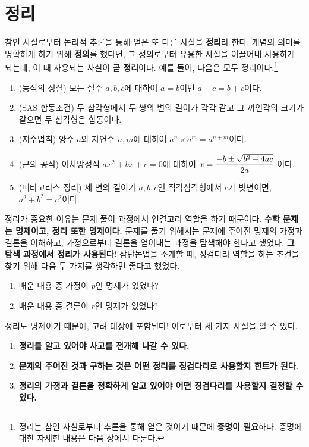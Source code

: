\pagebreak

\section{정리}

참인 사실로부터 논리적 추론을 통해 얻은 또 다른 사실을 \textbf{정리}라 한다. 개념의 의미를 명확하게 하기 위해 \textbf{정의}를 했다면, 그 정의로부터 유용한 사실을 이끌어내 사용하게 되는데, 이 때 사용되는 사실이 곧 \textbf{정리}이다. 예를 들어, 다음은 모두 정리이다.\footnote{정리는 참인 사실로부터 추론을 통해 얻은 것이기 때문에 \textbf{증명이 필요}하다. 증명에 대한 자세한 내용은 다음 장에서 다룬다.}

\begin{enumerate}
    \item (등식의 성질) 모든 실수 \(a, b, c\)에 대하여 \(a = b\)이면 \(a + c = b + c\)이다.
    \item (SAS 합동조건) 두 삼각형에서 두 쌍의 변의 길이가 각각 같고 그 끼인각의 크기가 같으면 두 삼각형은 합동이다.
    \item (지수법칙) 양수 \(a\)와 자연수 \(n, m\)에 대하여 \(a^n \times a^m = a^{n + m}\)이다.
    \item (근의 공식) 이차방정식 \(ax^2 + bx + c = 0\)에 대하여 \(x = \displaystyle \frac{-b \pm \sqrt{b^2 - 4ac}}{2a}\) 이다.
    \item (피타고라스 정리) 세 변의 길이가 \(a, b, c\)인 직각삼각형에서 \(c\)가 빗변이면, \(a^2 + b^2 = c^2\)이다.
\end{enumerate}

정리가 중요한 이유는 문제 풀이 과정에서 연결고리 역할을 하기 때문이다. \textbf{수학 문제는 명제이고, 정리 또한 명제이다.} 문제를 풀기 위해서는 문제에 주어진 명제의 가정과 결론을 이해하고, 가정으로부터 결론을 얻어내는 과정을 탐색해야 한다고 했었다. \textbf{그 탐색 과정에서 정리가 사용된다!} 삼단논법을 소개할 때, 징검다리 역할을 하는 조건을 찾기 위해 다음 두 가지를 생각하면 좋다고 했었다.

\begin{enumerate}
    \item 배운 내용 중 가정이 \(p\)인 명제가 있었나?
    \item 배운 내용 중 결론이 \(r\)인 명제가 있었나?
\end{enumerate}

정리도 명제이기 때문에, 고려 대상에 포함된다! 이로부터 세 가지 사실을 알 수 있다.

\begin{enumerate}
    \item \textbf{정리를 알고 있어야 사고를 전개해 나갈 수 있다.}
    \item \textbf{문제의 주어진 것과 구하는 것은 어떤 정리를 징검다리로 사용할지 힌트가 된다.}
    \item \textbf{정리의 가정과 결론을 정확하게 알고 있어야 어떤 징검다리를 사용할지 결정할 수 있다.}
\end{enumerate}

